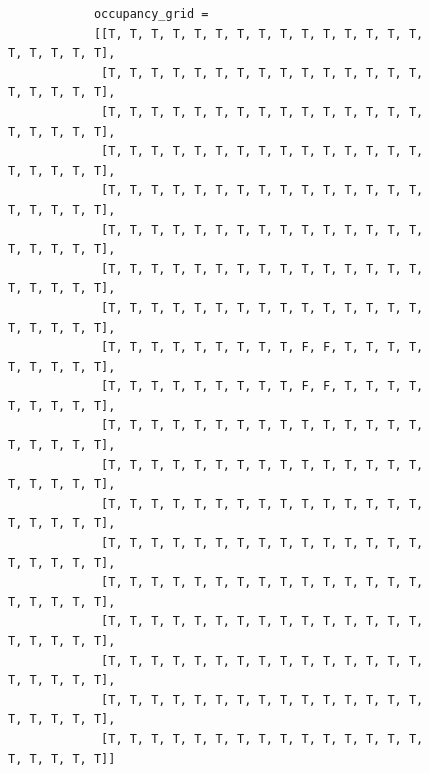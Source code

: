 \begin{figure}[H]
	\small
	\centering	
	\hspace*{\fill}
	\begin{minipage}{0.5\textwidth}%
		\begin{verbatim}
			occupancy_grid = 
			[[T, T, T, T, T, T, T, T, T, T, T, T, T, T, T, T, T, T, T, T],
			 [T, T, T, T, T, T, T, T, T, T, T, T, T, T, T, T, T, T, T, T],
			 [T, T, T, T, T, T, T, T, T, T, T, T, T, T, T, T, T, T, T, T],
			 [T, T, T, T, T, T, T, T, T, T, T, T, T, T, T, T, T, T, T, T],
			 [T, T, T, T, T, T, T, T, T, T, T, T, T, T, T, T, T, T, T, T],
			 [T, T, T, T, T, T, T, T, T, T, T, T, T, T, T, T, T, T, T, T],
			 [T, T, T, T, T, T, T, T, T, T, T, T, T, T, T, T, T, T, T, T],
			 [T, T, T, T, T, T, T, T, T, T, T, T, T, T, T, T, T, T, T, T],
			 [T, T, T, T, T, T, T, T, T, F, F, T, T, T, T, T, T, T, T, T],
			 [T, T, T, T, T, T, T, T, T, F, F, T, T, T, T, T, T, T, T, T],
			 [T, T, T, T, T, T, T, T, T, T, T, T, T, T, T, T, T, T, T, T],
			 [T, T, T, T, T, T, T, T, T, T, T, T, T, T, T, T, T, T, T, T],
			 [T, T, T, T, T, T, T, T, T, T, T, T, T, T, T, T, T, T, T, T],
			 [T, T, T, T, T, T, T, T, T, T, T, T, T, T, T, T, T, T, T, T],
			 [T, T, T, T, T, T, T, T, T, T, T, T, T, T, T, T, T, T, T, T],
			 [T, T, T, T, T, T, T, T, T, T, T, T, T, T, T, T, T, T, T, T],
			 [T, T, T, T, T, T, T, T, T, T, T, T, T, T, T, T, T, T, T, T],
			 [T, T, T, T, T, T, T, T, T, T, T, T, T, T, T, T, T, T, T, T],
			 [T, T, T, T, T, T, T, T, T, T, T, T, T, T, T, T, T, T, T, T]]
		\end{verbatim}
	\end{minipage}
	\hspace*{\fill}
	\begin{minipage}{0.35\textwidth}%
		\footnotesize

\end{minipage}
\end{figure}
